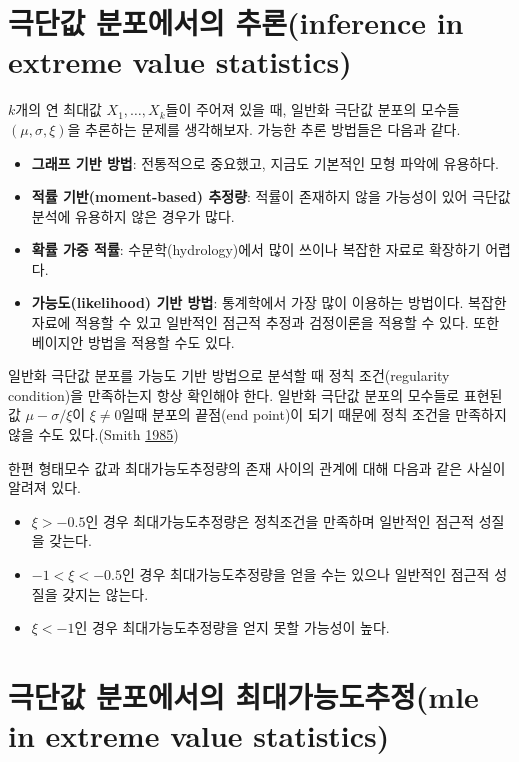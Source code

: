 \documentclass[b5paper,]{book}
\theoremstyle{definition}
\theoremstyle{definition}
\theoremstyle{definition}
\theoremstyle{remark}
\begin{document}
\section{극단값 분포에서의 추론(inference in extreme value
statistics)}\label{--inference-in-extreme-value-statistics}

\(k\)개의 연 최대값 \(X_{1}, \ldots , X_{k}\)들이 주어져 있을 때, 일반화
극단값 분포의 모수들 \((\mu, \sigma, \xi)\)을 추론하는 문제를
생각해보자. 가능한 추론 방법들은 다음과 같다.

\begin{itemize}
\item
  \textbf{그래프 기반 방법}: 전통적으로 중요했고, 지금도 기본적인 모형
  파악에 유용하다.
\item
  \textbf{적률 기반(moment-based) 추정량}: 적률이 존재하지 않을 가능성이
  있어 극단값 분석에 유용하지 않은 경우가 많다.
\item
  \textbf{확률 가중 적률}: 수문학(hydrology)에서 많이 쓰이나 복잡한
  자료로 확장하기 어렵다.
\item
  \textbf{가능도(likelihood) 기반 방법}: 통계학에서 가장 많이 이용하는
  방법이다. 복잡한 자료에 적용할 수 있고 일반적인 점근적 추정과
  검정이론을 적용할 수 있다. 또한 베이지안 방법을 적용할 수도 있다.
\end{itemize}

일반화 극단값 분포를 가능도 기반 방법으로 분석할 때 정칙 조건(regularity
condition)을 만족하는지 항상 확인해야 한다. 일반화 극단값 분포의
모수들로 표현된 값 \(\mu-\sigma/\xi\)이 \(\xi\neq 0\)일때 분포의
끝점(end point)이 되기 때문에 정칙 조건을 만족하지 않을 수도 있다.(Smith
\protect\hyperlink{ref-Smith1985}{1985})

한편 형태모수 값과 최대가능도추정량의 존재 사이의 관계에 대해 다음과
같은 사실이 알려져 있다.

\begin{itemize}
\item
  \(\xi > -0.5\)인 경우 최대가능도추정량은 정칙조건을 만족하며 일반적인
  점근적 성질을 갖는다.
\item
  \(-1 < \xi < -0.5\)인 경우 최대가능도추정량을 얻을 수는 있으나
  일반적인 점근적 성질을 갖지는 않는다.
\item
  \(\xi < -1\)인 경우 최대가능도추정량을 얻지 못할 가능성이 높다.
\end{itemize}

\section{극단값 분포에서의 최대가능도추정(mle in extreme value
statistics)}\label{--mle-in-extreme-value-statistics}
\end{document}
